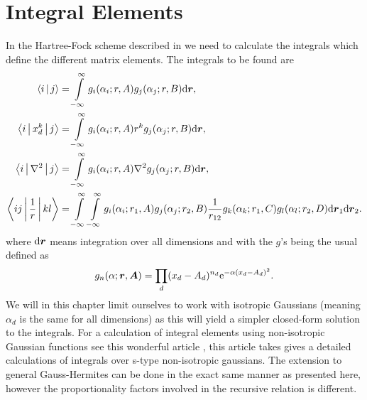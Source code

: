 \section{Integral Elements}
    In the Hartree-Fock scheme described in  we need to
    calculate the integrals which define the different matrix elements. The
    integrals to be found are
        \begin{equation}
            \begin{aligned}
                \Braket{i|j} &= \int\limits^{\infty}_{-\infty} g_i(\alpha_i;r,A)g_j(\alpha_j;r,B) \mathrm{d}
                \boldsymbol{{r}}, \\
                \Braket{i|x^k_d|j} &= \int\limits^{\infty}_{-\infty} g_i(\alpha_i;r,A) r^k
                g_j(\alpha_j;r,B) \mathrm{d} \boldsymbol{{r}}, \\
                \Braket{i|\nabla^2|j} &= \int\limits^{\infty}_{-\infty} g_i(\alpha_i;r,A)\nabla^2
                g_j(\alpha_j;r,B) \mathrm{d} \boldsymbol{{r}}, \\
                \Braket{ij|\frac{1}{r}|kl} &= \int\limits^{\infty}_{-\infty}\int\limits^{\infty}_{-\infty}
                g_i(\alpha_i;r_1,A)g_j(\alpha_j;r_2,B) \frac{1}{r_{12}}
                g_k(\alpha_k;r_1,C)g_l(\alpha_l;r_2,D) \mathrm{d} \boldsymbol{{r}}_1 \mathrm{d}
                \boldsymbol{{r}}_2.
            \end{aligned}
        \end{equation}
    where $\mathrm{d}\boldsymbol{{r}}$ means integration over all dimensions and with the
    $g$'s being the usual  defined as
        \begin{equation}
            g_n(\alpha;\boldsymbol{{r}},\boldsymbol{{A}}) = \prod_d (x_d-A_d)^{n_d}
            \mathrm{e}^{-\alpha (x_d-A_d)^2}.
            \label{eq:hermiteGauss2}
        \end{equation}
    We will in this chapter limit ourselves to work with isotropic Gaussians
    (meaning $\alpha_d$ is the same for all dimensions) as this will yield a
    simpler closed-form solution to the integrals. For a calculation of
    integral elements using non-isotropic Gaussian functions see this wonderful
    article \cite{nonIsoGauss}, this article takes gives a detailed
    calculations of integrals over s-type non-isotropic gaussians. The
    extension to general Gauss-Hermites can be done in the exact same manner as
    presented here, however the proportionality factors involved in the
    recursive relation is different. \\

